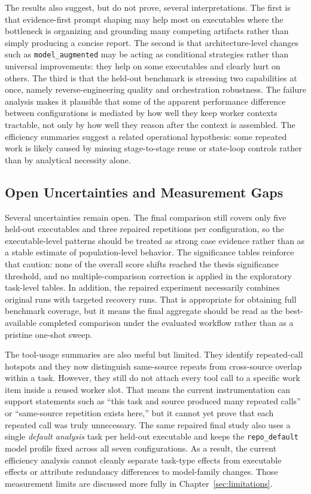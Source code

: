 The results also suggest, but do not prove, several interpretations. The first is that evidence-first prompt shaping may help most on executables where the bottleneck is organizing and grounding many competing artifacts rather than simply producing a concise report. The second is that architecture-level changes such as \texttt{model\_augmented} may be acting as conditional strategies rather than universal improvements: they help on some executables and clearly hurt on others. The third is that the held-out benchmark is stressing two capabilities at once, namely reverse-engineering quality and orchestration robustness. The failure analysis makes it plausible that some of the apparent performance difference between configurations is mediated by how well they keep worker contexts tractable, not only by how well they reason after the context is assembled. The efficiency summaries suggest a related operational hypothesis: some repeated work is likely caused by missing stage-to-stage reuse or state-loop controls rather than by analytical necessity alone.

\subsection{Open Uncertainties and Measurement Gaps}

Several uncertainties remain open. The final comparison still covers only five held-out executables and three repaired repetitions per configuration, so the executable-level patterns should be treated as strong case evidence rather than as a stable estimate of population-level behavior. The significance tables reinforce that caution: none of the overall score shifts reached the thesis significance threshold, and no multiple-comparison correction is applied in the exploratory task-level tables. In addition, the repaired experiment necessarily combines original runs with targeted recovery runs. That is appropriate for obtaining full benchmark coverage, but it means the final aggregate should be read as the best-available completed comparison under the evaluated workflow rather than as a pristine one-shot sweep.

The tool-usage summaries are also useful but limited. They identify repeated-call hotspots and they now distinguish same-source repeats from cross-source overlap within a task. However, they still do not attach every tool call to a specific work item inside a reused worker slot. That means the current instrumentation can support statements such as ``this task and source produced many repeated calls'' or ``same-source repetition exists here,'' but it cannot yet prove that each repeated call was truly unnecessary. The same repaired final study also uses a single \emph{default analysis} task per held-out executable and keeps the \texttt{repo\_default} model profile fixed across all seven configurations. As a result, the current efficiency analysis cannot cleanly separate task-type effects from executable effects or attribute redundancy differences to model-family changes. Those measurement limits are discussed more fully in Chapter~\ref{sec:limitations}.

